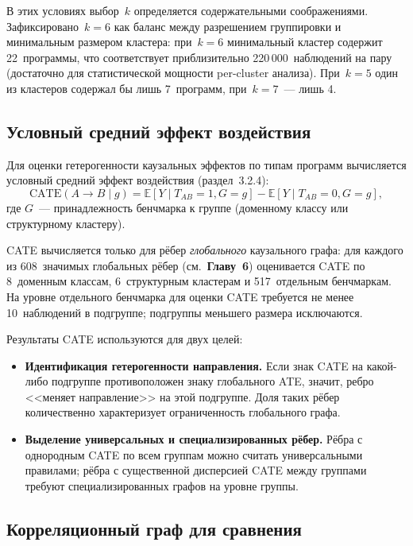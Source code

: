 В этих условиях выбор~$k$ определяется содержательными соображениями. Зафиксировано~$k = 6$ как баланс между разрешением группировки и минимальным размером кластера: при~$k = 6$ минимальный кластер содержит 22~программы, что соответствует приблизительно 220\,000~наблюдений на пару (достаточно для статистической мощности per-cluster анализа). При~$k = 5$ один из кластеров содержал бы лишь 7~программ, при~$k = 7$~--- лишь 4.

\subsection{Условный средний эффект воздействия}

Для оценки гетерогенности каузальных эффектов по типам программ вычисляется условный средний эффект воздействия (раздел~3.2.4):
\begin{equation*}
    \text{CATE}(A \to B \mid g) = \mathbb{E}[Y \mid T_{AB} = 1, G = g] - \mathbb{E}[Y \mid T_{AB} = 0, G = g],
\end{equation*}
где $G$~--- принадлежность бенчмарка к группе (доменному классу или структурному кластеру).

CATE вычисляется только для рёбер \emph{глобального} каузального графа: для каждого из 608~значимых глобальных рёбер (см.~\textbf{Главу~6}) оценивается CATE по 8~доменным классам, 6~структурным кластерам и 517~отдельным бенчмаркам. На уровне отдельного бенчмарка для оценки CATE требуется не менее 10~наблюдений в подгруппе; подгруппы меньшего размера исключаются.

Результаты CATE используются для двух целей:
\begin{itemize}
    \item \textbf{Идентификация гетерогенности направления.} Если знак CATE на какой-либо подгруппе противоположен знаку глобального ATE, значит, ребро <<меняет направление>> на этой подгруппе. Доля таких рёбер количественно характеризует ограниченность глобального графа.
    \item \textbf{Выделение универсальных и специализированных рёбер.} Рёбра с однородным CATE по всем группам можно считать универсальными правилами; рёбра с существенной дисперсией CATE между группами требуют специализированных графов на уровне группы.
\end{itemize}

\subsection{Корреляционный граф для сравнения}

